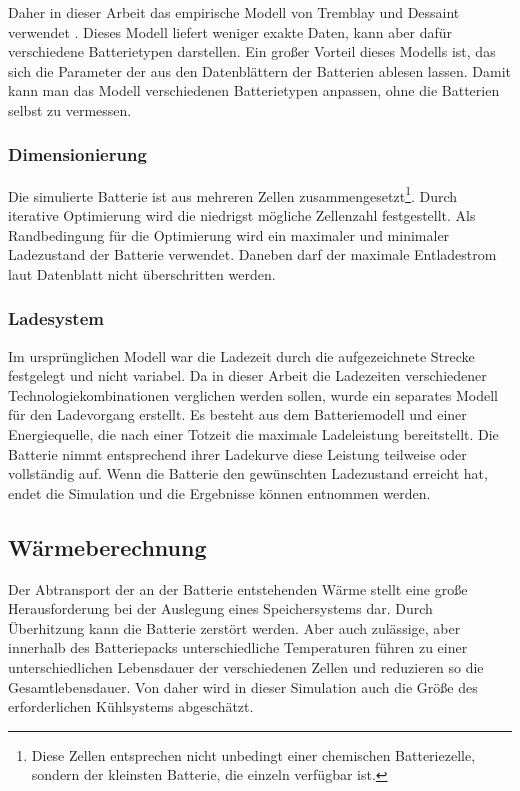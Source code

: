 Daher in dieser Arbeit das empirische Modell von Tremblay und Dessaint verwendet \cite{tremblay2009experimental}. Dieses Modell liefert weniger exakte Daten, kann aber dafür verschiedene Batterietypen darstellen. Ein großer Vorteil dieses Modells ist, das sich die Parameter der aus den Datenblättern der Batterien ablesen lassen. Damit kann man das Modell verschiedenen Batterietypen anpassen, ohne die Batterien selbst zu vermessen.

\subsubsection{Dimensionierung}
Die simulierte Batterie ist aus mehreren Zellen zusammengesetzt\footnote{Diese Zellen entsprechen nicht unbedingt einer chemischen Batteriezelle, sondern der kleinsten Batterie, die einzeln verfügbar ist.}. Durch iterative Optimierung wird die niedrigst mögliche Zellenzahl festgestellt. Als Randbedingung für die Optimierung wird ein maximaler und minimaler Ladezustand der Batterie verwendet. Daneben darf der maximale Entladestrom laut Datenblatt nicht überschritten werden.

\subsubsection{Ladesystem}
Im ursprünglichen Modell war die Ladezeit durch die aufgezeichnete Strecke festgelegt und nicht variabel. Da in dieser Arbeit die Ladezeiten verschiedener Technologiekombinationen verglichen werden sollen, wurde ein separates Modell für den Ladevorgang erstellt. Es besteht aus dem Batteriemodell und einer Energiequelle, die nach einer Totzeit die maximale Ladeleistung bereitstellt. Die Batterie nimmt entsprechend ihrer Ladekurve diese Leistung teilweise oder vollständig auf. Wenn die Batterie den gewünschten Ladezustand erreicht hat, endet die Simulation und die Ergebnisse können entnommen werden.

\subsection{Wärmeberechnung}
Der Abtransport der an der Batterie entstehenden Wärme stellt eine große Herausforderung bei der Auslegung eines Speichersystems dar. Durch Überhitzung kann die Batterie zerstört werden. Aber auch zulässige, aber innerhalb des Batteriepacks unterschiedliche Temperaturen führen zu einer unterschiedlichen Lebensdauer der verschiedenen Zellen und reduzieren so die Gesamtlebensdauer. Von daher wird in dieser Simulation auch die Größe des erforderlichen Kühlsystems abgeschätzt.

